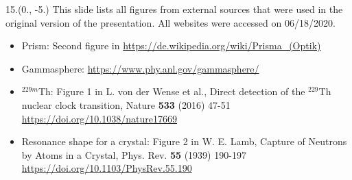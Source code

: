 \begin{textblock}{15.}(0., -5.)
    This slide lists all figures from external sources that were used in the original version of the presentation.
    All websites were accessed on 06/18/2020.

    \begin{itemize}
        \item Prism: Second figure in \url{https://de.wikipedia.org/wiki/Prisma_(Optik)}
        \item Gammasphere: \url{https://www.phy.anl.gov/gammasphere/}
        \item $^{229m}$Th: Figure 1 in L. von der Wense et al., Direct detection of the $^{229}$Th nuclear clock transition, Nature \textbf{533} (2016) 47-51 \url{https://doi.org/10.1038/nature17669}
        \item Resonance shape for a crystal: Figure 2 in W. E. Lamb, Capture of Neutrons by Atoms in a Crystal, Phys. Rev. \textbf{55} (1939) 190-197 \url{https://doi.org/10.1103/PhysRev.55.190}
    \end{itemize}
\end{textblock}
